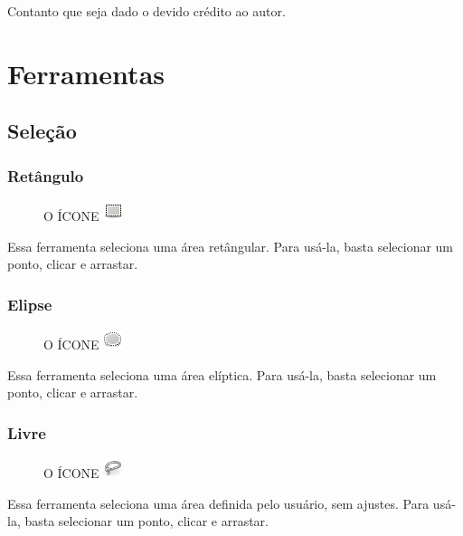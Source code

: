 \documentclass[12pt,onecolumn]{article}
\begin{document}
    Contanto que seja dado o devido crédito ao autor.
    
\clearpage
\section{Ferramentas}

  \subsection{Seleção}
    \subsubsection{Retângulo}
      \begin{figure}[H]
        O ÍCONE
        \includegraphics{gimp-icons/stock-tool-rect-select-22.png}
        \label{fig:rectselect}
      \end{figure}
      Essa ferramenta seleciona uma área retângular. Para usá-la, basta selecionar um ponto,
      clicar e arrastar.

      \subsubsection{Elipse}
      \begin{figure}[H]
        O ÍCONE
        \includegraphics{gimp-icons/stock-tool-ellipse-select-22.png}
        \label{fig:ellipseselect}
      \end{figure}
      Essa ferramenta seleciona uma área elíptica. Para usá-la, basta selecionar um ponto,
      clicar e arrastar.

      \subsubsection{Livre}
      \begin{figure}[H]
        O ÍCONE
        \includegraphics{gimp-icons/stock-tool-free-select-22.png}
        \label{fig:freeselect}
      \end{figure}
      Essa ferramenta seleciona uma área definida pelo usuário, sem ajustes. Para usá-la, basta
      selecionar um ponto, clicar e arrastar.
      
\end{document}

